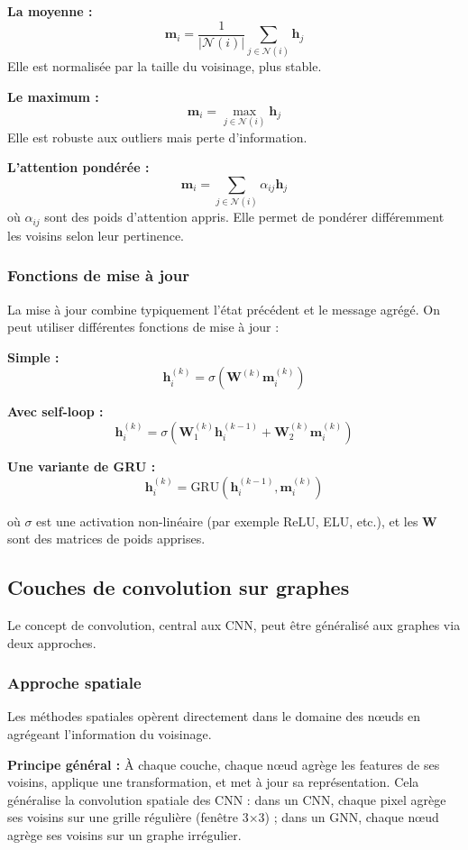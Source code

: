 \textbf{La moyenne :}
\[
\mathbf{m}_i = \frac{1}{|\mathcal{N}(i)|}\sum_{j \in \mathcal{N}(i)} \mathbf{h}_j
\]
Elle est normalisée par la taille du voisinage, plus stable.

\textbf{Le maximum :}
\[
\mathbf{m}_i = \max_{j \in \mathcal{N}(i)} \mathbf{h}_j
\]
Elle est robuste aux outliers mais perte d'information.

\textbf{L'attention pondérée :}
\[
\mathbf{m}_i = \sum_{j \in \mathcal{N}(i)} \alpha_{ij} \mathbf{h}_j
\]
où $\alpha_{ij}$ sont des poids d'attention appris. Elle permet de pondérer différemment les voisins selon leur pertinence.

\subsubsection{Fonctions de mise à jour}

La mise à jour combine typiquement l'état précédent et le message agrégé. On peut utiliser différentes fonctions de mise à jour :

\textbf{Simple :}
\[
\mathbf{h}_i^{(k)} = \sigma\left(\mathbf{W}^{(k)} \mathbf{m}_i^{(k)}\right)
\]

\textbf{Avec self-loop :}
\[
\mathbf{h}_i^{(k)} = \sigma\left(\mathbf{W}_1^{(k)} \mathbf{h}_i^{(k-1)} + \mathbf{W}_2^{(k)} \mathbf{m}_i^{(k)}\right)
\]

\textbf{Une variante de GRU :}
\[
\mathbf{h}_i^{(k)} = \text{GRU}\left(\mathbf{h}_i^{(k-1)}, \mathbf{m}_i^{(k)}\right)
\]

où $\sigma$ est une activation non-linéaire (par exemple ReLU, ELU, etc.), et les $\mathbf{W}$ sont des matrices de poids apprises.

\subsection{Couches de convolution sur graphes}

Le concept de convolution, central aux CNN, peut être généralisé aux graphes via deux approches.

\subsubsection{Approche spatiale}

Les méthodes spatiales opèrent directement dans le domaine des nœuds en agrégeant l'information du voisinage.

\textbf{Principe général :}
À chaque couche, chaque nœud agrège les features de ses voisins, applique une transformation, et met à jour sa représentation. Cela généralise la convolution spatiale des CNN : dans un CNN, chaque pixel agrège ses voisins sur une grille régulière (fenêtre 3×3) ; dans un GNN, chaque nœud agrège ses voisins sur un graphe irrégulier.

